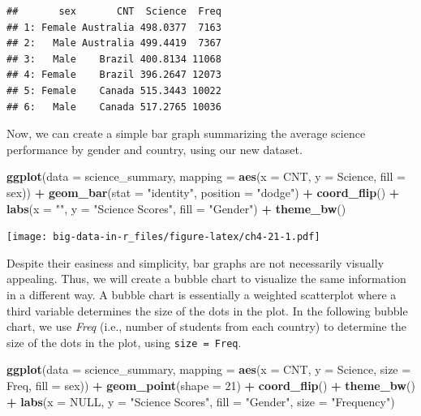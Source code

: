 \documentclass[]{book}
\newenvironment{Shaded}{\begin{snugshade}}{\end{snugshade}}
\newcommand{\DataTypeTok}[1]{\textcolor[rgb]{0.13,0.29,0.53}{#1}}
\newcommand{\DecValTok}[1]{\textcolor[rgb]{0.00,0.00,0.81}{#1}}
\newcommand{\KeywordTok}[1]{\textcolor[rgb]{0.13,0.29,0.53}{\textbf{#1}}}
\newcommand{\NormalTok}[1]{#1}
\newcommand{\OperatorTok}[1]{\textcolor[rgb]{0.81,0.36,0.00}{\textbf{#1}}}
\newcommand{\OtherTok}[1]{\textcolor[rgb]{0.56,0.35,0.01}{#1}}
\newcommand{\StringTok}[1]{\textcolor[rgb]{0.31,0.60,0.02}{#1}}
\begin{document}
\begin{verbatim}
##       sex       CNT  Science  Freq
## 1: Female Australia 498.0377  7163
## 2:   Male Australia 499.4419  7367
## 3:   Male    Brazil 400.8134 11068
## 4: Female    Brazil 396.2647 12073
## 5: Female    Canada 515.3443 10022
## 6:   Male    Canada 517.2765 10036
\end{verbatim}

Now, we can create a simple bar graph summarizing the average science performance by gender and country, using our new dataset.

\begin{Shaded}
\begin{Highlighting}[]
\KeywordTok{ggplot}\NormalTok{(}\DataTypeTok{data =}\NormalTok{ science_summary,}
       \DataTypeTok{mapping =} \KeywordTok{aes}\NormalTok{(}\DataTypeTok{x =}\NormalTok{ CNT, }\DataTypeTok{y =}\NormalTok{ Science, }\DataTypeTok{fill =}\NormalTok{ sex)) }\OperatorTok{+}
\StringTok{  }\KeywordTok{geom_bar}\NormalTok{(}\DataTypeTok{stat =} \StringTok{"identity"}\NormalTok{, }\DataTypeTok{position =} \StringTok{"dodge"}\NormalTok{) }\OperatorTok{+}
\StringTok{  }\KeywordTok{coord_flip}\NormalTok{() }\OperatorTok{+}
\StringTok{  }\KeywordTok{labs}\NormalTok{(}\DataTypeTok{x =} \StringTok{""}\NormalTok{, }\DataTypeTok{y =} \StringTok{"Science Scores"}\NormalTok{, }\DataTypeTok{fill =} \StringTok{"Gender"}\NormalTok{) }\OperatorTok{+}
\StringTok{  }\KeywordTok{theme_bw}\NormalTok{()}
\end{Highlighting}
\end{Shaded}

\texttt{[image: big-data-in-r\_files/figure-latex/ch4-21-1.pdf]}

Despite their easiness and simplicity, bar graphs are not necessarily visually appealing. Thus, we will create a bubble chart to visualize the same information in a different way. A bubble chart is essentially a weighted scatterplot where a third variable determines the size of the dots in the plot. In the following bubble chart, we use \emph{Freq} (i.e., number of students from each country) to determine the size of the dots in the plot, using \texttt{size\ =\ Freq}.

\begin{Shaded}
\begin{Highlighting}[]
\KeywordTok{ggplot}\NormalTok{(}\DataTypeTok{data =}\NormalTok{ science_summary,}
       \DataTypeTok{mapping =} \KeywordTok{aes}\NormalTok{(}\DataTypeTok{x =}\NormalTok{ CNT, }\DataTypeTok{y =}\NormalTok{ Science, }\DataTypeTok{size =}\NormalTok{ Freq, }\DataTypeTok{fill =}\NormalTok{ sex)) }\OperatorTok{+}
\StringTok{  }\KeywordTok{geom_point}\NormalTok{(}\DataTypeTok{shape =} \DecValTok{21}\NormalTok{) }\OperatorTok{+}
\StringTok{  }\KeywordTok{coord_flip}\NormalTok{() }\OperatorTok{+}
\StringTok{  }\KeywordTok{theme_bw}\NormalTok{() }\OperatorTok{+}
\StringTok{  }\KeywordTok{labs}\NormalTok{(}\DataTypeTok{x =} \OtherTok{NULL}\NormalTok{, }\DataTypeTok{y =} \StringTok{"Science Scores"}\NormalTok{, }\DataTypeTok{fill =} \StringTok{"Gender"}\NormalTok{,}
       \DataTypeTok{size =} \StringTok{"Frequency"}\NormalTok{)}
\end{Highlighting}
\end{Shaded}
\end{document}
